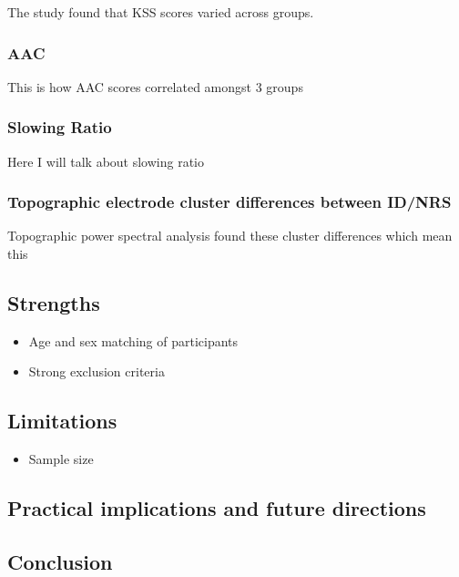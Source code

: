 \documentclass[
]{article}
\providecommand{\tightlist}{%
  \setlength{\itemsep}{0pt}\setlength{\parskip}{0pt}}
\begin{document}
The study found that KSS scores varied across groups.

\subsubsection{AAC}\label{aac}

This is how AAC scores correlated amongst 3 groups

\subsubsection{Slowing Ratio}\label{slowing-ratio}

Here I will talk about slowing ratio

\subsubsection{Topographic electrode cluster differences between
ID/NRS}\label{topographic-electrode-cluster-differences-between-idnrs}

Topographic power spectral analysis found these cluster differences
which mean this

\subsection{Strengths}\label{strengths}

\begin{itemize}
\tightlist
\item
  Age and sex matching of participants
\item
  Strong exclusion criteria
\end{itemize}

\subsection{Limitations}\label{limitations}

\begin{itemize}
\tightlist
\item
  Sample size
\end{itemize}

\subsection{Practical implications and future
directions}\label{practical-implications-and-future-directions}

\subsection{Conclusion}\label{conclusion}
\end{document}
